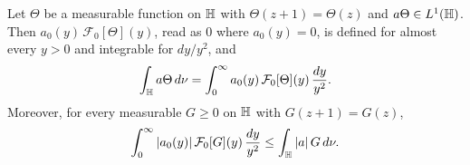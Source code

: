 \begin{lemma}\label{ev:meanlem}
Let $\Theta$ be a measurable function on $\mathbb{H}$ with $\Theta(z+1)=\Theta(z)$ and $a\Theta\in L^1(\mathbb{H})$. Then $a_0(y)\,\mathcal F_0[\Theta](y)$, read as $0$ where $a_0(y)=0$, is
defined for almost every $y>0$ and integrable for $dy/y^2$, and
\begin{equation}\label{ev:meaneq}
  \int_{\mathbb{H}} a\Theta\,d\nu=\int_0^\infty a_0(y)\,\mathcal F_0[\Theta](y)\,\frac{dy}{y^2}.
\end{equation}
Moreover, for every measurable $G\ge0$ on $\mathbb{H}$ with $G(z+1)=G(z)$,
\begin{equation}\label{ev:meanineq}
  \int_0^\infty|a_0(y)|\,\mathcal F_0[G](y)\,\frac{dy}{y^2}\le\int_{\mathbb{H}}|a|\,G\,d\nu .
\end{equation}
\end{lemma}
